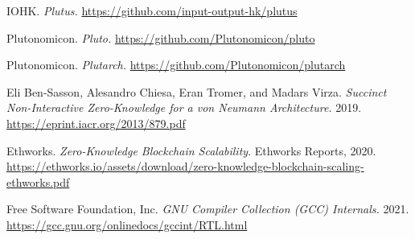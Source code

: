 \documentclass[12pt]{article}
\begin{document}
\begin{thebibliography}{6}

	 IOHK. \textit{Plutus.} \url{https://github.com/input-output-hk/plutus}

	 Plutonomicon. \textit{Pluto.} \url{https://github.com/Plutonomicon/pluto}

	 Plutonomicon. \textit{Plutarch.} \url{https://github.com/Plutonomicon/plutarch}

	 Eli Ben-Sasson, Alesandro Chiesa, Eran Tromer, and Madars Virza. \textit{Succinct Non-Interactive Zero-Knowledge for a von Neumann Architecture.} 2019. \url{https://eprint.iacr.org/2013/879.pdf}

Ethworks. \textit{Zero-Knowledge Blockchain Scalability}. Ethworks Reports, 2020. \url{https://ethworks.io/assets/download/zero-knowledge-blockchain-scaling-ethworks.pdf}

	Free Software Foundation, Inc. \textit{GNU Compiler Collection (GCC) Internals.} 2021. \url{https://gcc.gnu.org/onlinedocs/gccint/RTL.html}

\end{thebibliography}
\end{document}
